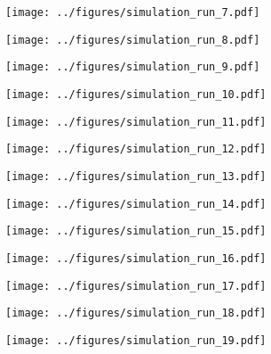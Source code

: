 \documentclass[13pt]{amsart}
\begin{document}
\begin{figure}
    \texttt{[image: ../figures/simulation\_run\_7.pdf]}
\end{figure}

\begin{figure}
    \texttt{[image: ../figures/simulation\_run\_8.pdf]}
\end{figure}

\begin{figure}
    \texttt{[image: ../figures/simulation\_run\_9.pdf]}
\end{figure}

\begin{figure}
    \texttt{[image: ../figures/simulation\_run\_10.pdf]}
\end{figure}

\begin{figure}
    \texttt{[image: ../figures/simulation\_run\_11.pdf]}
\end{figure}

\begin{figure}
    \texttt{[image: ../figures/simulation\_run\_12.pdf]}
\end{figure}

\begin{figure}
    \texttt{[image: ../figures/simulation\_run\_13.pdf]}
\end{figure}

\begin{figure}
    \texttt{[image: ../figures/simulation\_run\_14.pdf]}
\end{figure}

\begin{figure}
    \texttt{[image: ../figures/simulation\_run\_15.pdf]}
\end{figure}

\begin{figure}
    \texttt{[image: ../figures/simulation\_run\_16.pdf]}
\end{figure}

\begin{figure}
    \texttt{[image: ../figures/simulation\_run\_17.pdf]}
\end{figure}

\begin{figure}
    \texttt{[image: ../figures/simulation\_run\_18.pdf]}
\end{figure}

\begin{figure}
    \texttt{[image: ../figures/simulation\_run\_19.pdf]}
\end{figure}
\end{document}
